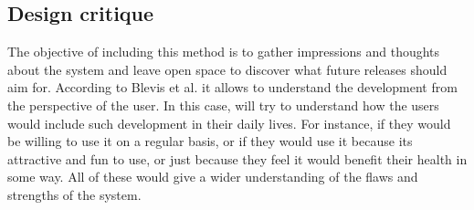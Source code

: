 \subsection{Design critique}
The objective of including this method is to gather impressions and thoughts about the system and leave open space to discover what future releases should aim for. According to Blevis et al. \cite{Blevis2007} it allows to understand the development from the perspective of the user. In this case, will try to understand how the users would include such development in their daily lives. For instance, if they would be willing to use it on a regular basis, or if they would use it because its attractive and fun to use, or just because they feel it would benefit their health in some way. All of these would give a wider understanding of the flaws and strengths of the system.

\iffalse
\quotes{Process of discourse on many levels of the nature and effects of an ultimate particular design}. \quotes{Comment on the qualities of an ultimate particular from an holistic perspective, including reason, ethics, and aesthetics as well as minute details of form and external effects on culture}.\cite{Blevis2007}
\fi

